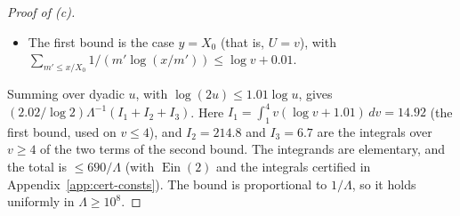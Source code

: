 \begin{proof}[Proof of (c)]
\begin{itemize}
$P^+(m')\le y+H(y)$. The realised primes in $(y,y+H(y)]$ number at most $2.01H(y)$ (their slots start in an interval of length
$2H(y)(1+10^{-6})$, and consecutive continuous-slot starts are almost $1$ apart), and each has $p^{2/\log y-1}\le7.4/y$; so they
change the Euler product below by a factor $\le\exp(15H(X_0)/X_0)\le1+e^{-0.9\Lambda}$, which its factor $2$ absorbs. Rankin's method with exponent $1-2/\log y$ bounds $\sum1/m'$ by
$e^{-2(U-1)}\prod_{p\le y}(1-p^{2/\log y-1})^{-1}\le e^{-2(U-1)}\cdot2e^{\gamma}e^{\operatorname{Ein}(2)}\log y$. Mertens' theorem for the
realised primes is Lemma~\ref{lem:cm}(iii),(iv), and $\NN$ is free on its primes.
\item The first bound is the case $y=X_0$ (that is, $U=v$), with $\sum_{m'\le x/X_0}1/(m'\log(x/m'))\le\log v+0.01$.
\end{itemize}
Summing over dyadic $u$, with $\log(2u)\le1.01\log u$, gives $(2.02/\log2)\Lambda^{-1}(I_1+I_2+I_3)$. Here
$I_1=\int_1^4v(\log v+1.01)\,dv=14.92$ (the first bound, used on $v\le4$), and $I_2=214.8$ and $I_3=6.7$ are the integrals over $v\ge4$ of the two
terms of the second bound. The integrands are elementary, and the total is $\le690/\Lambda$ (with $\operatorname{Ein}(2)$ and the
integrals certified in Appendix~\ref{app:cert-consts}). The bound is proportional to $1/\Lambda$,
so it holds uniformly in $\Lambda\ge10^8$.
\end{proof}


